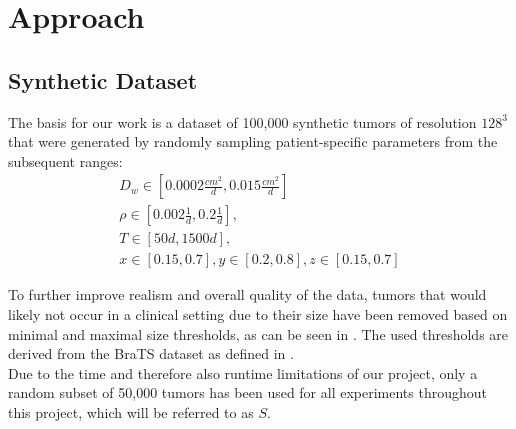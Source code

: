 

\chapter{Approach}\label{chapter:approach}

\section{Synthetic Dataset}\label{dataset}
The basis for our work is a dataset of 100,000 synthetic tumors of resolution $128^3$ that were generated by
randomly sampling patient-specific parameters from the subsequent ranges:
\begin{gather*}
    D_w \in [0.0002 \frac{cm^2}{d}, 0.015 \frac{cm^2}{d}] \\%
    \rho \in [0.002 \frac{1}{d} , 0.2 \frac{1}{d}], \\ %
    T \in [50d, 1500d], \\
    x \in [0.15,0.7], y \in [0.2, 0.8], z \in [0.15, 0.7]
\end{gather*}

To further improve realism and overall quality of the data, tumors that would likely not occur in a clinical setting due to their size have been removed based on minimal and maximal size thresholds, as can be seen in \parencite{Steinbauer2020}. The used thresholds are derived from the BraTS dataset as defined in \parencite{MenzeMultiModalApproach}.\\
Due to the time and therefore also runtime limitations of our project, only a random subset of 50,000 tumors has been used for all experiments throughout this project, which will be referred to as $S$.


